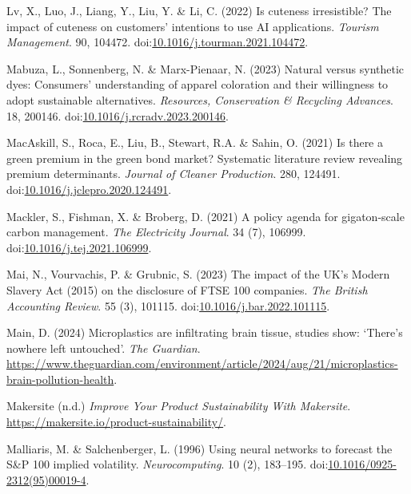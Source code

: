 \documentclass[
  letterpaper,
  DIV=11,
  numbers=noendperiod]{scrartcl}
\newlength{\cslhangindent}
\newenvironment{CSLReferences}[2] %
 {\begin{list}{}{%
  \setlength{\itemindent}{0pt}
  \setlength{\leftmargin}{0pt}
  \setlength{\parsep}{0pt}
  \ifodd #1
   \setlength{\leftmargin}{\cslhangindent}
   \setlength{\itemindent}{-1\cslhangindent}
  \fi
  \setlength{\itemsep}{#2\baselineskip}}}
 {\end{list}}
\begin{document}
\begin{CSLReferences}{0}{1}
Lv, X., Luo, J., Liang, Y., Liu, Y. \& Li, C. (2022) Is cuteness
irresistible? {The} impact of cuteness on customers' intentions to use
{AI} applications. \emph{Tourism Management}. 90, 104472.
doi:\href{https://doi.org/10.1016/j.tourman.2021.104472}{10.1016/j.tourman.2021.104472}.

Mabuza, L., Sonnenberg, N. \& Marx-Pienaar, N. (2023) Natural versus
synthetic dyes: {Consumers}' understanding of apparel coloration and
their willingness to adopt sustainable alternatives. \emph{Resources,
Conservation \& Recycling Advances}. 18, 200146.
doi:\href{https://doi.org/10.1016/j.rcradv.2023.200146}{10.1016/j.rcradv.2023.200146}.

MacAskill, S., Roca, E., Liu, B., Stewart, R.A. \& Sahin, O. (2021) Is
there a green premium in the green bond market? {Systematic} literature
review revealing premium determinants. \emph{Journal of Cleaner
Production}. 280, 124491.
doi:\href{https://doi.org/10.1016/j.jclepro.2020.124491}{10.1016/j.jclepro.2020.124491}.

Mackler, S., Fishman, X. \& Broberg, D. (2021) A policy agenda for
gigaton-scale carbon management. \emph{The Electricity Journal}. 34 (7),
106999.
doi:\href{https://doi.org/10.1016/j.tej.2021.106999}{10.1016/j.tej.2021.106999}.

Mai, N., Vourvachis, P. \& Grubnic, S. (2023) The impact of the {UK}'s
{Modern Slavery Act} (2015) on the disclosure of {FTSE} 100 companies.
\emph{The British Accounting Review}. 55 (3), 101115.
doi:\href{https://doi.org/10.1016/j.bar.2022.101115}{10.1016/j.bar.2022.101115}.

Main, D. (2024) Microplastics are infiltrating brain tissue, studies
show: {`{There}'s nowhere left untouched'}. \emph{The Guardian}.
\url{https://www.theguardian.com/environment/article/2024/aug/21/microplastics-brain-pollution-health}.

Makersite (n.d.) \emph{Improve {Your Product Sustainability With
Makersite}}. \url{https://makersite.io/product-sustainability/}.

Malliaris, M. \& Salchenberger, L. (1996) Using neural networks to
forecast the {S}\&{P} 100 implied volatility. \emph{Neurocomputing}. 10
(2), 183--195.
doi:\href{https://doi.org/10.1016/0925-2312(95)00019-4}{10.1016/0925-2312(95)00019-4}.


\end{CSLReferences}
\end{document}
